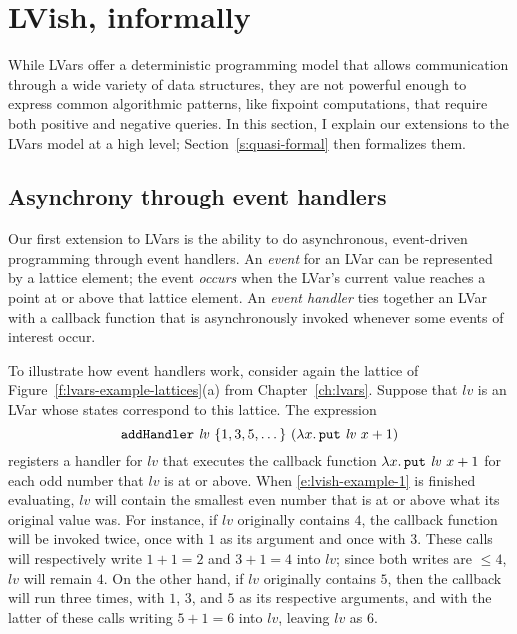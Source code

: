 \section{LVish, informally}\label{s:quasi-informal}

While LVars offer a deterministic programming model that allows
communication through a wide variety of data structures, they are not
powerful enough to express common algorithmic patterns, like fixpoint
computations, that require both positive and negative queries.  In
this section, I explain our extensions to the LVars model at a high
level; Section~\ref{s:quasi-formal} then formalizes them.

\subsection{Asynchrony through event handlers}

Our first extension to LVars is the ability to do asynchronous,
event-driven programming through event handlers.  An \emph{event} for
an LVar can be represented by a lattice element; the event
\emph{occurs} when the LVar's current value reaches a point at or
above that lattice element.  An \emph{event handler} ties together an
LVar with a callback function that is asynchronously invoked whenever
some events of interest occur.

To illustrate how event handlers work, consider again the lattice of
Figure~\ref{f:lvars-example-lattices}(a) from Chapter~\ref{ch:lvars}.
Suppose that $\mathit{lv}$ is an LVar whose states correspond to this
lattice.  The expression
\begin{equation}
  {\mbox{\texttt{addHandler}}}~\mathit{lv}~\{ 1, 3, 5, \dots \}~(\lambda x.\,\mbox{\texttt{put}}~\mathit{lv}~x+1)
\label{e:lvish-example-1}
\end{equation}
registers a handler for $\mathit{lv}$ that executes the callback
function $\lambda x.\,\mbox{\texttt{put}}~\mathit{lv}~x+1$ for each odd number that
$\mathit{lv}$ is at or above.  When \ref{e:lvish-example-1} is
finished evaluating, $\mathit{lv}$ will contain the smallest even
number that is at or above what its original value was.  For instance,
if $\mathit{lv}$ originally contains $4$, the callback function will
be invoked twice, once with $1$ as its argument and once with $3$.
These calls will respectively write $1+1 = 2$ and $3+1 = 4$ into
$\mathit{lv}$; since both writes are $\leq 4$, $\mathit{lv}$ will
remain $4$.  On the other hand, if $\mathit{lv}$ originally contains
$5$, then the callback will run three times, with $1$, $3$, and $5$ as
its respective arguments, and with the latter of these calls writing
$5+1 = 6$ into $\mathit{lv}$, leaving $\mathit{lv}$ as $6$.

